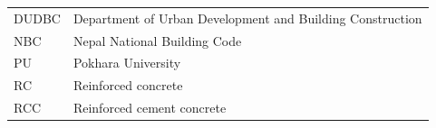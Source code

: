 \begin{tabular}{@{}ll@{}}
DUDBC & Department of Urban Development and Building Construction\\
NBC & Nepal National Building Code\\
PU & Pokhara University\\
RC & Reinforced concrete\\
RCC & Reinforced cement concrete\\
\end{tabular}
